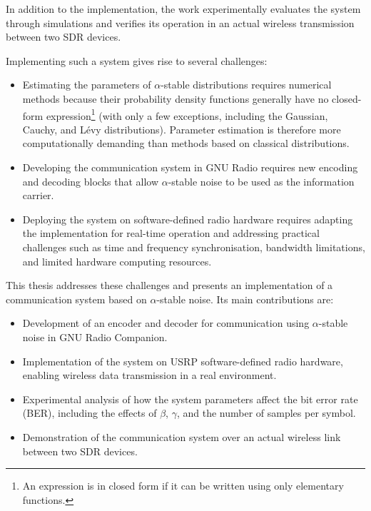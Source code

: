\documentclass[a4paper, 12pt, openany]{book}
\begin{document}
In addition to the implementation, the work experimentally evaluates the system through simulations and verifies its operation in an actual wireless transmission between two SDR devices.

Implementing such a system gives rise to several challenges:

\begin{itemize}
	 \item Estimating the parameters of $\alpha$-stable distributions requires numerical methods because their probability density functions generally have no closed-form expression\footnote{An expression is in closed form if it can be written using only elementary functions.} (with only a few exceptions, including the Gaussian, Cauchy, and Lévy distributions). Parameter estimation is therefore more computationally demanding than methods based on classical distributions.

    \item Developing the communication system in GNU Radio requires new encoding and decoding blocks that allow $\alpha$-stable noise to be used as the information carrier.

    \item Deploying the system on software-defined radio hardware requires adapting the implementation for real-time operation and addressing practical challenges such as time and frequency synchronisation, bandwidth limitations, and limited hardware computing resources.
\end{itemize}

This thesis addresses these challenges and presents an implementation of a communication system based on $\alpha$-stable noise. Its main contributions are:

\begin{itemize}

\item Development of an encoder and decoder for communication using $\alpha$-stable noise in GNU Radio Companion.

\item Implementation of the system on USRP software-defined radio hardware, enabling wireless data transmission in a real environment.

\item Experimental analysis of how the system parameters affect the bit error rate (BER), including the effects of $\beta$, $\gamma$, and the number of samples per symbol.

\item Demonstration of the communication system over an actual wireless link between two SDR devices.

\end{itemize}
\end{document}
